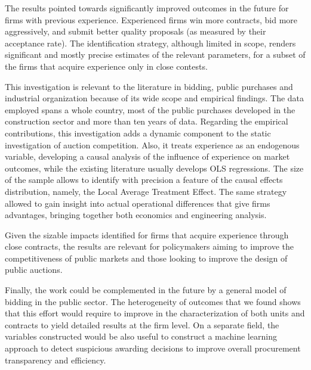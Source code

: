 The results pointed towards significantly improved outcomes in the future for firms with previous experience. Experienced firms win more contracts, bid more aggressively, and submit better quality proposals (as measured by their acceptance rate). The identification strategy, although limited in scope, renders significant and mostly precise estimates of the relevant parameters, for a subset of the firms that acquire experience only in close contests.

This investigation is relevant to the literature in bidding, public purchases and industrial organization because of its wide scope and empirical findings. The data employed spans a whole country, most of the public purchases developed in the construction sector and more than ten years of data. Regarding the empirical contributions, this investigation adds a dynamic component to the static investigation of auction competition. Also, it treats experience as an endogenous variable, developing a causal analysis of the influence of experience on market outcomes, while the existing literature usually develops OLS regressions. The size of the sample allows to identify with precision a feature of the causal effects distribution, namely, the Local Average Treatment Effect. The same strategy allowed to gain insight into actual operational differences that give firms advantages, bringing together both economics and engineering analysis.

Given the sizable impacts identified for firms that acquire experience through close contracts, the results are relevant for policymakers aiming to improve the competitiveness of public markets and those looking to improve the design of public auctions.

Finally, the work could be complemented in the future by a general model of bidding in the public sector. The heterogeneity of outcomes that we found shows that this effort would require to improve in the characterization of both units and contracts to yield detailed results at the firm level. On a separate field, the variables constructed would be also useful to construct a machine learning approach to detect suspicious awarding decisions to improve overall procurement transparency and efficiency.

